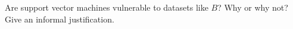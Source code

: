 \item {} Are support vector machines vulnerable to datasets like $B$? Why or why not? Give an informal
justification.

